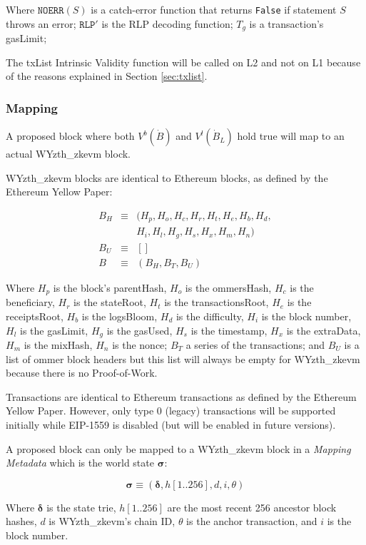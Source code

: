 \documentclass[9pt,oneside]{amsart}
\begin{document}
\begin{multicols}{2}
Where $\texttt{NOERR}(S)$ is a catch-error function that returns \texttt{False} if statement $S$ throws an error; $\texttt{RLP}'$ is the RLP decoding function;  $T_g$ is a transaction's gasLimit; 

The txList Intrinsic Validity function will be called on L2 and not on L1 because of the reasons explained in Section \ref{sec:txlist}.

\subsubsection{Mapping}

A proposed block where both $V^b(\dot{B})$ and $V^l(\dot{B}_L)$ hold true will map to an actual WYzth_zkevm block.

WYzth_zkevm blocks are identical to Ethereum blocks, as defined by the Ethereum Yellow Paper\cite{yellow-paper}:

\begin{eqnarray}
B_H & \equiv & (H_p, H_o, H_c, H_r, H_t, H_e, H_b, H_d, \\
\nonumber & & H_i, H_l,H_g, H_s, H_x, H_m, H_n) \\
B_U  & \equiv & [] \\
B & \equiv & (B_H, B_T, B_U)
\end{eqnarray}

Where $H_p$ is the block's parentHash, $H_o$ is the ommersHash, $H_c$ is the beneficiary, $H_r$ is the stateRoot, $H_t$ is the transactionsRoot, $H_e$ is the receiptsRoot, $H_b$ is the logsBloom, $H_d$ is the difficulty, $H_i$ is the block number, $H_l$ is the gasLimit, $H_g$ is the gasUsed, $H_s$ is the timestamp, $H_x$ is the extraData, $H_m$ is the mixHash, $H_n$ is the nonce; $B_T$ a series of the transactions; and $B_U$ is a list of ommer block headers but this list will always be empty for WYzth_zkevm because there is no Proof-of-Work.

Transactions are identical to Ethereum transactions as defined by the Ethereum Yellow Paper\cite{yellow-paper}. However, only type 0 (legacy) transactions will be supported initially while EIP-1559 is disabled (but will be enabled in future versions).

A proposed block can only be mapped to a WYzth_zkevm block in a \emph{Mapping Metadata} which is the world state $\boldsymbol{\sigma}$:

$$\boldsymbol{\sigma} \equiv (\boldsymbol{\delta}, h[1..256], d, i, \theta)$$

Where $\boldsymbol{\delta}$ is the state trie, $h[1..256]$ are the most recent 256 ancestor block hashes, $d$ is WYzth_zkevm's chain ID, $\theta$ is the anchor transaction, and $i$ is the block number.


\end{multicols}
\end{document}
